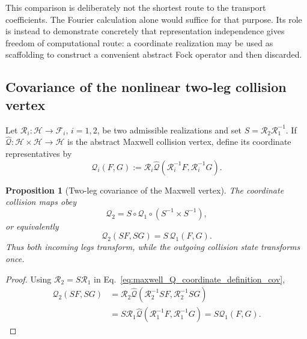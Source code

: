\documentclass[11pt,oneside]{article}
\numberwithin{equation}{section}
\newtheorem{proposition}[theorem]{Proposition}
\theoremstyle{definition}
\begin{document}
This comparison is deliberately not the shortest route to the transport coefficients.  The Fourier calculation alone would suffice for that purpose.  Its role is instead to demonstrate concretely that representation independence gives freedom of computational route: a coordinate realization may be used as scaffolding to construct a convenient abstract Fock operator and then discarded.

\subsection{Covariance of the nonlinear two-leg collision vertex}
\label{subsec:maxwell_covariance}

Let $\mathcal R_i:\mathscr H\to\mathscr F_i$, $i=1,2$, be two admissible realizations and set $S=\mathcal R_2\mathcal R_1^{-1}$.  If $\widehat{\mathcal Q}:\mathscr H\times\mathscr H\to\mathscr H$ is the abstract Maxwell collision vertex, define its coordinate representatives by
\begin{equation}
\mathcal Q_i(F,G)
:=\mathcal R_i\widehat{\mathcal Q}(\mathcal R_i^{-1}F,\mathcal R_i^{-1}G).
\label{eq:maxwell_Q_coordinate_definition_cov}
\end{equation}

\begin{proposition}[Two-leg covariance of the Maxwell vertex]
The coordinate collision maps obey
\begin{equation}
\boxed{
\mathcal Q_2
=
S\circ\mathcal Q_1\circ(S^{-1}\times S^{-1}),
}
\label{eq:maxwell_coordinate_covariance_map}
\end{equation}
or equivalently
\begin{equation}
\mathcal Q_2(SF,SG)=S\,\mathcal Q_1(F,G).
\label{eq:maxwell_coordinate_covariance}
\end{equation}
Thus both incoming legs transform, while the outgoing collision state transforms once.
\end{proposition}

\begin{proof}
Using $\mathcal R_2=S\mathcal R_1$ in Eq.~\eqref{eq:maxwell_Q_coordinate_definition_cov},
\begin{align}
\mathcal Q_2(SF,SG)
&=\mathcal R_2\widehat{\mathcal Q}(\mathcal R_2^{-1}SF,\mathcal R_2^{-1}SG)\\
&=S\mathcal R_1\widehat{\mathcal Q}(\mathcal R_1^{-1}F,\mathcal R_1^{-1}G)
=S\mathcal Q_1(F,G).
\end{align}
\end{proof}
\end{document}
